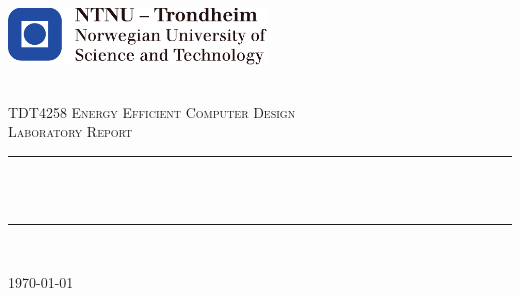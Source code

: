 \begin{titlepage}
\includegraphics[height=1.5cm]{images/ntnu_logo.pdf}\\[1cm]   
\begin{center}

 
~\\[1.5cm]

\textsc{\Large TDT4258 Energy Efficient Computer Design\\Laboratory Report}\\[0.5cm]

\hrule ~\\[0.2cm]
{\huge \bfseries \mytitle}\\[0.4cm]		%
\hrule ~\\[1.5cm]

\begin{minipage}{0.4\textwidth}
    \centering
	\large
		\myauthor
\end{minipage}

\vfill

{\large \today}

\end{center}
\end{titlepage}